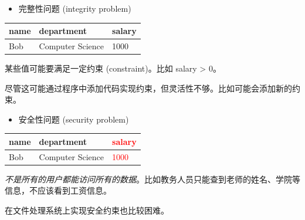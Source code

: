 \documentclass[aspectratio=169, 14pt]{beamer}
\begin{document}
\begin{frame}
    \begin{itemize}
        \item \alert{完整性问题
        } (integrity problem)
    \end{itemize}

    \begin{table}
        \begin{tabular}{lll}
          \toprule
          name & department & salary \\
          \midrule
          Bob & Computer Science & 1000 \\
          \bottomrule
        \end{tabular}
    \end{table}
    某些值可能要满足一定约束 (constraint)。比如 salary > 0。

    尽管这可能通过程序中添加代码实现约束，但灵活性不够。比如可能会添加新的约束。
\end{frame}

\begin{frame}
    \begin{itemize}
        \item \alert{安全性问题
        } (security problem)
    \end{itemize}
    \begin{table}
        \begin{tabular}{lll}
          \toprule
          name & department & \textcolor{red}{salary} \\
          \midrule
          Bob & Computer Science & \textcolor{red}{1000} \\
          \bottomrule
        \end{tabular}
    \end{table}

    \emph{不是所有的用户都能访问所有的数据}。比如教务人员只能查到老师的姓名、学院等信息，不应该看到工资信息。

    在文件处理系统上实现安全约束也比较困难。    
\end{frame}
\end{document}
